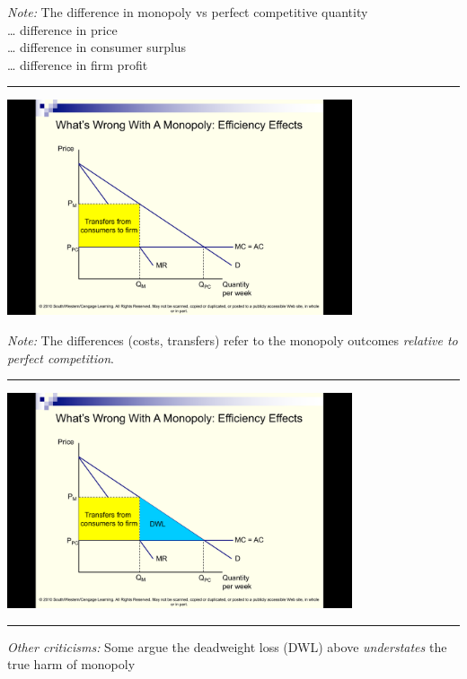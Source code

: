 \documentclass[]{article}
\begin{document}
\emph{Note:} The difference in monopoly vs perfect competitive
quantity\\
\ldots{} difference in price\\
\ldots{} difference in consumer surplus\\
\ldots{} difference in firm profit

\begin{center}\rule{0.5\linewidth}{\linethickness}\end{center}

\includegraphics[height=2.5in]{picsfigs/dwl2.png}

\emph{Note:} The differences (costs, transfers) refer to the monopoly
outcomes \emph{relative to perfect competition}.

\begin{center}\rule{0.5\linewidth}{\linethickness}\end{center}

\includegraphics[height=2.5in]{picsfigs/dwl3.png}

\begin{center}\rule{0.5\linewidth}{\linethickness}\end{center}

\emph{Other criticisms:} Some argue the deadweight loss (DWL) above
\emph{understates} the true harm of monopoly
\end{document}
